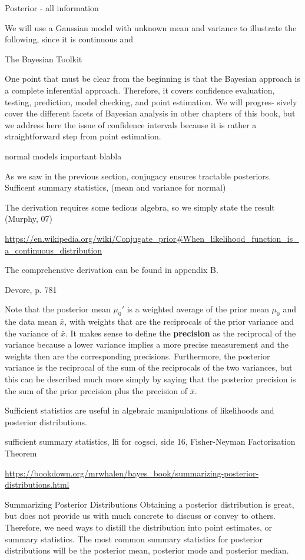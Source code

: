 Posterior - all information

We will use a Gaussian model with unknown mean and variance to illustrate the following, since it is continuous and

The Bayesian Toolkit

One point that must be clear from the beginning is that the Bayesian approach is a complete inferential approach. Therefore, it covers confidence evaluation, testing, prediction, model checking, and point estimation. We will progres- sively cover the different facets of Bayesian analysis in other chapters of this book, but we address here the issue of confidence intervals because it is rather a straightforward step from point estimation.

normal models important blabla

As we saw in the previous section, conjugacy ensures tractable posteriors. Sufficent summary statistics, (mean and variance for normal)

The derivation requires some tedious algebra, so we simply state the result (Murphy, 07)

\url{https://en.wikipedia.org/wiki/Conjugate_prior#When_likelihood_function_is_a_continuous_distribution}


The comprehensive derivation can be found in appendix B. 

Devore, p. 781 

Note that the posterior mean $\mu_0'$ is a weighted average of the prior mean $\mu_0$ and the data mean $\bar{x}$, with weights that are the reciprocals of the prior variance and the variance of $\bar{x}$. It makes sense to define the \textbf{precision} as the reciprocal of the variance because a lower variance implies a more precise measurement and the weights then are the corresponding precisions. Furthermore, the posterior variance is the reciprocal of the sum of the reciprocals of the two variances, but this can be described much more simply by saying that the posterior precision is the sum of the prior precision plus the precision of $\bar{x}$.  


Sufficient statistics are useful in algebraic manipulations of likelihoods and posterior distributions.

sufficient summary statistics, lfi for cogsci, side 16, Fisher-Neyman Factorization Theorem

\url{https://bookdown.org/mrwhalen/bayes_book/summarizing-posterior-distributions.html}

Summarizing Posterior Distributions
Obtaining a posterior distribution is great, but does not provide us with much concrete to discuss or convey to others. Therefore, we need ways to distill the distribution into point estimates, or summary statistics. The most common summary statistics for posterior distributions will be the posterior mean, posterior mode and posterior median.

